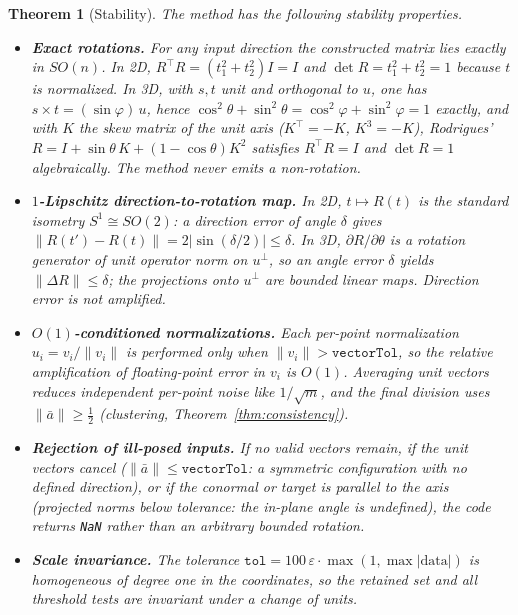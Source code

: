 \documentclass[11pt]{article}
\newtheorem{theorem}{Theorem}
\newcommand{\norm}[1]{\lVert #1 \rVert}
\begin{document}
\begin{theorem}[Stability]\label{thm:stability}
The method has the following stability properties.
\begin{itemize}
\item[(a)] \textbf{Exact rotations.} For any input direction the
  constructed matrix lies exactly in $SO(n)$. In 2D,
  $R^{\top}R=(t_1^2+t_2^2)I=I$ and $\det R=t_1^2+t_2^2=1$ because $t$ is
  normalized. In 3D, with $s,t$ unit and orthogonal to $u$, one has
  $s\times t=(\sin\varphi)\,u$, hence
  $\cos^2\theta+\sin^2\theta=\cos^2\varphi+\sin^2\varphi=1$ exactly, and
  with $K$ the skew matrix of the \emph{unit} axis ($K^{\top}=-K$,
  $K^3=-K$), Rodrigues'
  $R=I+\sin\theta\,K+(1-\cos\theta)K^2$ satisfies $R^{\top}R=I$ and
  $\det R=1$ algebraically. The method never emits a non-rotation.
\item[(b)] \textbf{$1$-Lipschitz direction-to-rotation map.} In 2D,
  $t\mapsto R(t)$ is the standard isometry $S^1\cong SO(2)$: a direction
  error of angle $\delta$ gives
  $\norm{R(t')-R(t)}=2\lvert\sin(\delta/2)\rvert\le\delta$. In 3D,
  $\partial R/\partial\theta$ is a rotation generator of unit operator
  norm on $u^\perp$, so an angle error $\delta$ yields
  $\norm{\Delta R}\le\delta$; the projections onto $u^\perp$ are
  bounded linear maps. Direction error is not amplified.
\item[(c)] \textbf{$O(1)$-conditioned normalizations.} Each per-point
  normalization $u_i=v_i/\norm{v_i}$ is performed only when
  $\norm{v_i}>\texttt{vectorTol}$, so the relative amplification of
  floating-point error in $v_i$ is $O(1)$. Averaging \emph{unit}
  vectors reduces independent per-point noise like $1/\sqrt m$, and the
  final division uses $\norm{\bar a}\ge\tfrac12$ (clustering,
  Theorem~\ref{thm:consistency}).
\item[(d)] \textbf{Rejection of ill-posed inputs.} If no valid vectors
  remain, if the unit vectors cancel
  ($\norm{\bar a}\le\texttt{vectorTol}$: a symmetric configuration with
  no defined direction), or if the conormal or target is parallel to
  the axis (projected norms below tolerance: the in-plane angle is
  undefined), the code returns \texttt{NaN} rather than an arbitrary
  bounded rotation.
\item[(e)] \textbf{Scale invariance.} The tolerance
  $\texttt{tol}=100\,\varepsilon\cdot\max(1,\max\lvert\text{data}\rvert)$
  is homogeneous of degree one in the coordinates, so the retained set
  and all threshold tests are invariant under a change of units.
\end{itemize}
\end{theorem}
\end{document}
